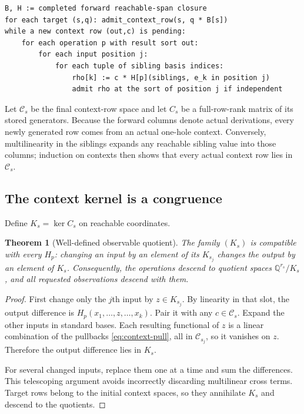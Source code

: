 \documentclass[11pt,letterpaper]{article}
\newtheorem{theorem}{Theorem}[section]
\theoremstyle{definition}\newtheorem{definition}[theorem]{Definition}
\theoremstyle{remark}\newtheorem{remark}[theorem]{Remark}
\newcommand{\Q}{\mathbb Q}
\newcommand{\Ker}{\operatorname{ker}}
\begin{document}
\begin{lstlisting}
B, H := completed forward reachable-span closure
for each target (s,q): admit_context_row(s, q * B[s])
while a new context row (out,c) is pending:
    for each operation p with result sort out:
        for each input position j:
            for each tuple of sibling basis indices:
                rho[k] := c * H[p](siblings, e_k in position j)
                admit rho at the sort of position j if independent
\end{lstlisting}

Let $\mathcal C_s$ be the final context-row space and let $C_s$ be a full-row-rank matrix of its stored generators. Because the forward columns denote actual derivations, every newly generated row comes from an actual one-hole context. Conversely, multilinearity in the siblings expands any reachable sibling value into those columns; induction on contexts then shows that every actual context row lies in $\mathcal C_s$.

\subsection{The context kernel is a congruence}
Define $K_s=\Ker C_s$ on reachable coordinates.

\begin{theorem}[Well-defined observable quotient]\label{thm:quotient}
The family $(K_s)$ is compatible with every $H_p$: changing an input by an element of its $K_{s_j}$ changes the output by an element of $K_s$. Consequently, the operations descend to quotient spaces $\Q^{r_s}/K_s$, and all requested observations descend with them.
\end{theorem}
\begin{proof}
First change only the $j$th input by $z\in K_{s_j}$. By linearity in that slot, the output difference is $H_p(x_1,\ldots,z,\ldots,x_k)$. Pair it with any $c\in\mathcal C_s$. Expand the other inputs in standard bases. Each resulting functional of $z$ is a linear combination of the pullbacks \eqref{eq:context-pull}, all in $\mathcal C_{s_j}$, so it vanishes on $z$. Therefore the output difference lies in $K_s$.

For several changed inputs, replace them one at a time and sum the differences. This telescoping argument avoids incorrectly discarding multilinear cross terms. Target rows belong to the initial context spaces, so they annihilate $K_s$ and descend to the quotients.
\end{proof}
\end{document}
